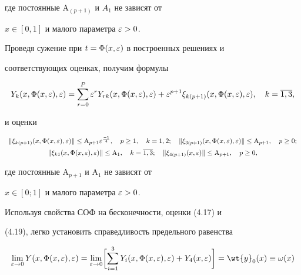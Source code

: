 где постоянные $\mathrm{A}_{(p +1)}$ и $A_1$ не зависят от


$x\in [0,1]$ и малого параметра $\varepsilon > 0$.


Проведя сужение при $t = \Phi (x, \varepsilon)$ в построенных решениях и


соответствующих оценках, получим формулы


\begin{equation}


Y_k (x, \Phi(x, \e), \e) = \sum \limits_{r=0} ^P \e^r Y_{rk}(x,


\Phi(x, \e), \e) + \e^{p+1} \xi_{k(p+1)} (x, \Phi(x, \e), \e),


\quad k =\overline{1,3},


\end{equation}


и оценки


\begin{equation}


\begin{array}{c}


\| \xi_{k(p+1)} (x, \Phi(x, \e), \e) \| \leq


\mathrm{A}_{p+1} \e^{\frac{-1}{4}},


\quad p \geq 1, \quad k = 1,2; \quad


\| \xi_{3(p+1)} (x, \Phi(x, \e), \e) \| \leq


\mathrm{A}_{p+1}, \quad p \geq 0; \\[2mm]


%


\| \xi_{k1} (x, \Phi(x, \e), \e) \| \leq


\mathrm{A}_{1},\quad k = \overline{1,3};\quad \| \xi_{4(p+1)} (x, \e) \| \leq


\mathrm{A}_{p +1}, \quad p \geq 0,


\end{array}


\end{equation}


где постоянные $\mathrm{A}_{p +1}$ и $\mathrm{A}_1$ не зависят от


$x \in [0;1]$ и малого параметра $\varepsilon >0$.


Используя свойства СОФ на бесконечности, оценки (4.17) и 


(4.19), легко установить справедливость предельного равенства


\begin{equation}


\lim_{\e \to 0} Y(x, \Phi(x, \e), \e) = \lim_{\e \to 0} \biggl[


\sum \limits_{i=1}^3 Y_i (x, \Phi(x, \e), \e) + Y_4 (x, \e)


\biggr] = \wt{y}_{0} (x) \equiv \omega (x) 


\end{equation}


